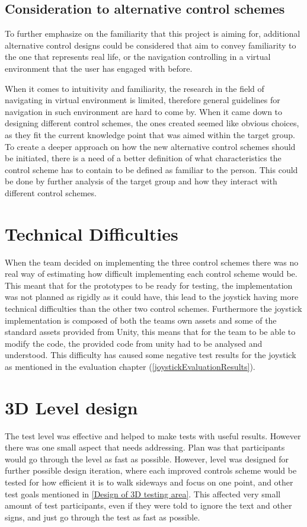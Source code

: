 \subsection*{Consideration to alternative control schemes}
To further emphasize on the familiarity that this project is aiming for, additional alternative control designs could be considered that aim to convey familiarity to the one that represents real life, or the navigation controlling in a virtual environment that the user has engaged with before.

When it comes to intuitivity and familiarity, the research in the field of navigating in virtual environment is limited, therefore general guidelines for navigation in such environment are hard to come by. When it came down to designing different control schemes, the ones created seemed like obvious choices, as they fit the current knowledge point that was aimed within the target group. To create a deeper approach on how the new alternative control schemes should be initiated, there is a need of a better definition of what characteristics the control scheme has to contain to be defined as familiar to the person. This could be done by further analysis of the target group and how they interact with different control schemes.

\section*{Technical Difficulties}
When the team decided on implementing the three control schemes there was no real way of estimating how difficult implementing each control scheme would be. This meant that for the prototypes to be ready for testing, the implementation was not planned as rigidly as it could have, this lead to the joystick having more technical difficulties than the other two control schemes. Furthermore the joystick implementation is composed of both the teams own assets and some of the standard assets provided from Unity, this means that for the team to be able to modify the code, the provided code from unity had to be analysed and understood. This difficulty has caused some negative test results for the joystick as mentioned in the evaluation chapter (\ref{joystickEvaluationResults}). 

\section*{3D Level design}
The test level was effective and helped to make tests with useful results. However there was one small aspect that needs addressing. Plan was that participants would go through the level as fast as possible. However, level was designed for further possible design iteration, where each improved controls scheme would be tested for how efficient it is to walk sideways and focus on one point, and other test goals mentioned in \ref {Design of 3D testing area}. This affected very small amount of test participants, even if they were told to ignore the text and other signs, and just go through the test as fast as possible. 

